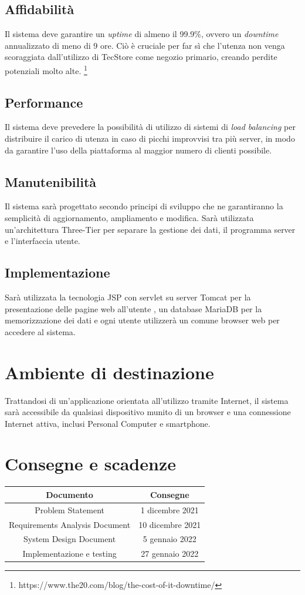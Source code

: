 \documentclass[12pt,a4paper]{article}
\begin{document}
\subsection{Affidabilità}
Il sistema deve garantire un \emph{uptime} di almeno il 99.9\%, ovvero un \textit{downtime} annualizzato di meno di 9 ore. Ciò è cruciale per far sì che l'utenza non venga scoraggiata dall'utilizzo di TecStore come negozio primario, creando perdite potenziali molto alte. \footnote{https://www.the20.com/blog/the-cost-of-it-downtime/}

\subsection{Performance}
Il sistema deve prevedere la possibilità di utilizzo di sistemi di \textit{load balancing} per distribuire il carico di utenza in caso di picchi improvvisi tra più server, in modo da garantire l'uso della piattaforma al maggior numero di clienti possibile.

\subsection{Manutenibilità}
Il sistema sarà progettato secondo principi di sviluppo che ne garantiranno la semplicità di aggiornamento, ampliamento e modifica.
Sarà utilizzata un'architettura Three-Tier per separare la gestione dei dati, il programma server e l'interfaccia utente.

\subsection{Implementazione}
Sarà utilizzata la tecnologia JSP con servlet su server Tomcat per la presentazione delle pagine web all'utente , un database MariaDB per la memorizzazione dei dati e ogni utente utilizzerà un comune browser web per accedere al sistema.

\section{Ambiente di destinazione}

Trattandosi di un'applicazione orientata all'utilizzo tramite Internet, il sistema sarà accessibile da qualsiasi dispositivo munito di un browser e una connessione Internet attiva, inclusi Personal Computer e smartphone.

\section{Consegne e scadenze}

\begin{center}
\begin{tabular} {| c | c |}
\hline
\textbf{Documento} & \textbf{Consegne} \\
\hline
Problem Statement & 1 dicembre 2021 \\
Requirements Analysis Document & 10 dicembre 2021 \\
System Design Document & 5 gennaio 2022 \\
Implementazione e testing & 27 gennaio 2022 \\
\hline
\end{tabular}
\end{center}
\end{document}
